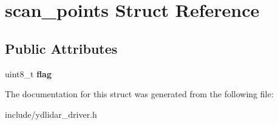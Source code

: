 \hypertarget{structscan__points}{}\section{scan\+\_\+points Struct Reference}
\label{structscan__points}
\subsection*{Public Attributes}
\begin{DoxyCompactItemize}
\item 
uint8\+\_\+t {\bfseries flag}\hypertarget{structscan__points_ae2f1ac4c7f2d11a3db2eec0da4eae66e}{}\label{structscan__points_ae2f1ac4c7f2d11a3db2eec0da4eae66e}

\end{DoxyCompactItemize}


The documentation for this struct was generated from the following file\+:\begin{DoxyCompactItemize}
\item 
include/ydlidar\+\_\+driver.\+h\end{DoxyCompactItemize}

